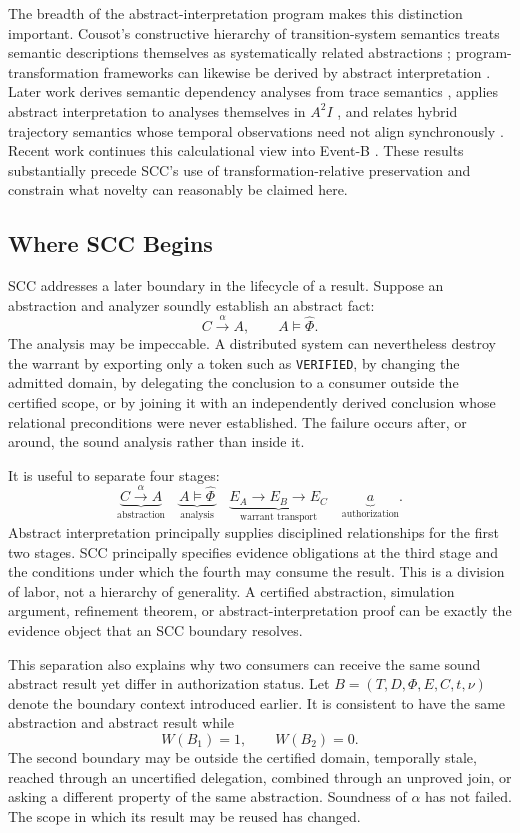 \documentclass[11pt]{article}
\begin{document}
The breadth of the abstract-interpretation program makes this distinction important. Cousot's constructive hierarchy of transition-system semantics treats semantic descriptions themselves as systematically related abstractions \cite{cousot2002hierarchy}; program-transformation frameworks can likewise be derived by abstract interpretation \cite{cousot2002transformation}. Later work derives semantic dependency analyses from trace semantics \cite{cousot2019dependency}, applies abstract interpretation to analyses themselves in $A^2I$ \cite{cousot2019a2i}, and relates hybrid trajectory semantics whose temporal observations need not align synchronously \cite{cousot2023trajectories}. Recent work continues this calculational view into Event-B \cite{cousot2026eventb}. These results substantially precede SCC's use of transformation-relative preservation and constrain what novelty can reasonably be claimed here.

\subsection{Where SCC Begins}
SCC addresses a later boundary in the lifecycle of a result. Suppose an abstraction and analyzer soundly establish an abstract fact:
\[
C\xrightarrow{\alpha}A,\qquad A\models\widehat{\Phi}.
\]
The analysis may be impeccable. A distributed system can nevertheless destroy the warrant by exporting only a token such as \texttt{VERIFIED}, by changing the admitted domain, by delegating the conclusion to a consumer outside the certified scope, or by joining it with an independently derived conclusion whose relational preconditions were never established. The failure occurs after, or around, the sound analysis rather than inside it.

It is useful to separate four stages:
\[
\underbrace{C\xrightarrow{\alpha}A}_{\text{abstraction}}\quad
\underbrace{A\models\widehat{\Phi}}_{\text{analysis}}\quad
\underbrace{E_A\rightarrow E_B\rightarrow E_C}_{\text{warrant transport}}\quad
\underbrace{a}_{\text{authorization}}.
\]
Abstract interpretation principally supplies disciplined relationships for the first two stages. SCC principally specifies evidence obligations at the third stage and the conditions under which the fourth may consume the result. This is a division of labor, not a hierarchy of generality. A certified abstraction, simulation argument, refinement theorem, or abstract-interpretation proof can be exactly the evidence object that an SCC boundary resolves.

This separation also explains why two consumers can receive the same sound abstract result yet differ in authorization status. Let $B=(T,D,\Phi,E,C,t,\nu)$ denote the boundary context introduced earlier. It is consistent to have the same abstraction and abstract result while
\[
W(B_1)=1,\qquad W(B_2)=0.
\]
The second boundary may be outside the certified domain, temporally stale, reached through an uncertified delegation, combined through an unproved join, or asking a different property of the same abstraction. Soundness of $\alpha$ has not failed. The scope in which its result may be reused has changed.
\end{document}
